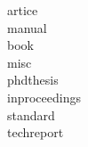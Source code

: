 artice \cite{artice}\\
manual \cite[Section Nr.]{manual}\\
book \cite[Section Nr.]{inbook}\\
misc \cite[Section Nr.]{misc}\\
phdthesis \cite[Section Nr.]{phdthesis}\\
inproceedings \cite[Section Nr.]{inproceedings}\\
standard \cite[Section Nr.]{standard}\\
techreport \cite[Section Nr.]{techreport}\\








